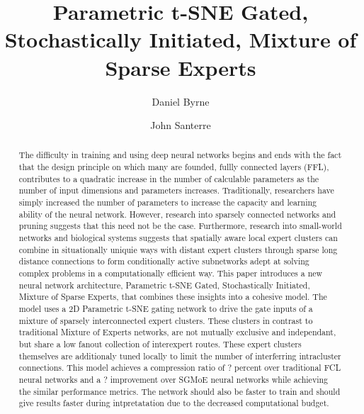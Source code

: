 \documentclass{llncs}
\title{Parametric t-SNE Gated, Stochastically Initiated, Mixture of Sparse Experts}
\author{
 Daniel Byrne\inst{1} \and
 John Santerre\inst{1}
}
\institute{
Master of Science in Data Science, Southern Methodist University,
Dallas TX 75275 USA
\email{\{byrned,santeerej\}@smu.edu}
}
\begin{document}
\maketitle              %

\setcounter{footnote}{0}
\begin{abstract}

The difficulty in training and using deep neural networks begins and ends with the fact that the design principle on which many are founded, fullly connected layers (FFL), contributes to a quadratic increase in the number of calculable parameters as the number of input dimensions and parameters increases. Traditionally, researchers have simply increased the number of parameters to increase the capacity and learning ability of the neural network. However, research into sparsely connected networks and pruning suggests that this need not be the case.  Furthermore, research into small-world networks and biological systems suggests that spatially aware local expert clusters can combine in situationally uniquie ways with distant expert clusters through sparse long distance connections to form conditionally active subnetworks adept at solving complex problems in a computationally efficient way. This paper introduces a new neural network architecture, Parametric t-SNE Gated, Stochastically Initiated, Mixture of Sparse Experts, that combines these insights into a cohesive model.  The model uses a 2D Parametric t-SNE gating network to drive the gate inputs of a mixture of sparsely interconnected expert clusters. These clusters in contrast to traditional Mixture of Experts networks, are not mutually exclusive and independant, but share a low fanout collection of interexpert routes.  These expert clusters themselves are additionaly tuned locally to limit the number of interferring intracluster connections. This model achieves a compression ratio of  ? percent over traditional FCL neural networks and a ? improvement over SGMoE neural networks while achieving the similar performance metrics.  The network should also be faster to train and should give results faster during intpretatation due to the decreased computational budget.

\end{abstract}

\end{document}

